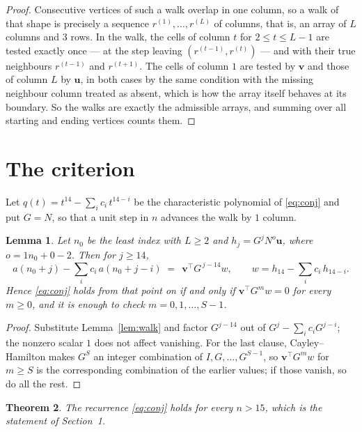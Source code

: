 \documentclass[11pt,a4paper]{article}
\theoremstyle{plain}
\newtheorem{theorem}{Theorem}
\newtheorem{lemma}[theorem]{Lemma}
\theoremstyle{definition}
\begin{document}
\begin{proof}
Consecutive vertices of such a walk overlap in one column, so a walk of that shape is
precisely a sequence $r^{(1)},\dots,r^{(L)}$ of columns, that is, an array of $L$ columns
and $3$ rows. In the walk, the cells of column $t$ for $2\le t\le L-1$ are tested
exactly once --- at the step leaving $(r^{(t-1)},r^{(t)})$ --- and with their true
neighbours $r^{(t-1)}$ and $r^{(t+1)}$. The cells of column $1$ are tested by
$\mathbf{v}$ and those of column $L$ by $\mathbf{u}$, in both cases by the same condition
with the missing neighbour column treated as absent, which is how the array itself behaves at
its boundary. So the walks are exactly the admissible arrays, and summing over all starting
and ending vertices counts them.
\end{proof}

\section{The criterion}

Let $q(t)=t^{14}-\sum_i c_i\,t^{14-i}$ be the characteristic polynomial of
\eqref{eq:conj} and put $G=N$, so that a unit step in $n$ advances the walk by
$1$ column.

\begin{lemma}\label{lem:crit}
Let $n_0$ be the least index with $L\ge2$ and $h_j=G^{j}N^{o}\mathbf{u}$, where
$o=1n_0+0-2$. Then for $j\ge14$,
\[
a(n_0+j)-\sum_i c_i\,a(n_0+j-i)\;=\;\,\mathbf{v}^{\!\top}G^{\,j-14}w,
\qquad w=h_{14}-\sum_i c_i\,h_{14-i} .
\]
Hence \eqref{eq:conj} holds from that point on if and only if
$\mathbf{v}^{\!\top}G^{m}w=0$ for every $m\ge0$, and it is enough to check
$m=0,1,\dots,S-1$.
\end{lemma}

\begin{proof}
Substitute Lemma~\ref{lem:walk} and factor $G^{j-14}$ out of
$G^{j}-\sum_ic_iG^{j-i}$; the nonzero scalar $1$ does not affect
vanishing. For the last clause, Cayley--Hamilton makes $G^{S}$ an integer combination of
$I,G,\dots,G^{S-1}$, so $\mathbf{v}^{\!\top}G^{m}w$ for $m\ge S$ is the corresponding
combination of the earlier values; if those vanish, so do all the rest.
\end{proof}

\begin{theorem}
The recurrence \eqref{eq:conj} holds for every $n>15$, which is the statement of
Section~1.
\end{theorem}
\end{document}
